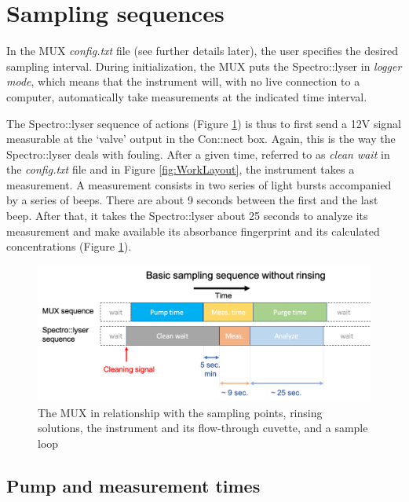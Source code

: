 \documentclass[]{book}
\begin{document}
\hypertarget{sampling-sequences}{%
\section{Sampling sequences}\label{sampling-sequences}}

In the MUX \emph{config.txt} file (see further details later), the user specifies the desired sampling interval. During initialization, the MUX puts the Spectro::lyser in \emph{logger mode}, which means that the instrument will, with no live connection to a computer, automatically take measurements at the indicated time interval.

The Spectro::lyser sequence of actions (Figure \ref{fig:BasicSequence}) is thus to first send a 12V signal measurable at the `valve' output in the Con::nect box. Again, this is the way the Spectro::lyser deals with fouling. After a given time, referred to as \emph{clean wait} in the \emph{config.txt} file and in Figure \ref{fig:WorkLayout}, the instrument takes a measurement. A measurement consists in two series of light bursts accompanied by a series of beeps. There are about 9 seconds between the first and the last beep. After that, it takes the Spectro::lyser about 25 seconds to analyze its measurement and make available its absorbance fingerprint and its calculated concentrations (Figure \ref{fig:BasicSequence}).

\begin{figure}

{\centering \includegraphics[width=0.8\linewidth]{pictures/BasicSequence} 

}

\caption{The MUX in relationship with the sampling points, rinsing solutions, the instrument and its flow-through cuvette, and a sample loop}\label{fig:BasicSequence}
\end{figure}

\hypertarget{pump-and-measurement-times}{%
\subsection{Pump and measurement times}\label{pump-and-measurement-times}}
\end{document}

